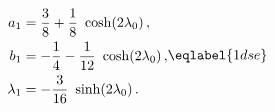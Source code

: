 \begin{equation}
\begin{split}
a_1&=\frac{3}{8}+\frac{1}{8}\  \cosh(2\lambda_0)\,,\\
b_1&=-\frac{1}{4}-\frac{1}{12}\  \cosh(2\lambda_0)\,,\\
\lambda_1&=-\frac{3}{16}\ \sinh(2\lambda_0)\,.\\
\end{split}
\eqlabel{1dse}
\end{equation}

